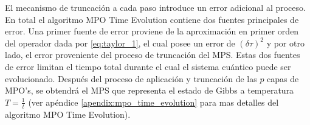 El mecanismo de truncación a cada paso introduce un error adicional al proceso. En total el algoritmo MPO Time Evolution contiene dos fuentes principales de error. Una primer fuente de error proviene de la aproximación en primer orden del operador dada por \ref{eq:taylor_1}, el cual posee un error de $(\delta \tau)^2$ y por otro lado, el error proveniente del proceso de truncación del MPS. Estas dos fuentes de error limitan el tiempo total durante el cual el sistema cuántico puede ser evolucionado. Después del proceso de aplicación y truncación de las $p$ capas de MPO's, se obtendrá el MPS que representa el estado de Gibbs a temperatura $T = \frac{1}{t}$ (ver apéndice \ref{apendix:mpo_time_evolution} para mas detalles del algoritmo MPO Time Evolution).